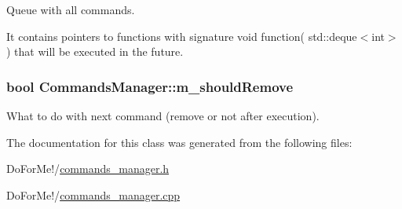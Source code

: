 Queue with all commands. 

It contains pointers to functions with signature void function( std\-::deque$<$int$>$ ) that will be executed in the future. \hypertarget{class_commands_manager_a0732a178dc1347026f7df12b76a0d8de}{
\subsubsection[{m\-\_\-should\-Remove}]{\setlength{\rightskip}{0pt plus 5cm}bool Commands\-Manager\-::m\-\_\-should\-Remove\hspace{0.3cm}{\ttfamily [private]}}}\label{class_commands_manager_a0732a178dc1347026f7df12b76a0d8de}


What to do with next command (remove or not after execution). 



The documentation for this class was generated from the following files\-:\begin{DoxyCompactItemize}
\item 
Do\-For\-Me!/\hyperlink{commands__manager_8h}{commands\-\_\-manager.\-h}\item 
Do\-For\-Me!/\hyperlink{commands__manager_8cpp}{commands\-\_\-manager.\-cpp}\end{DoxyCompactItemize}
